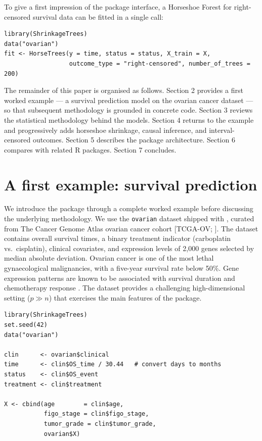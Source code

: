 To give a first impression of the package interface, a Horseshoe Forest for right-censored survival data can be fitted in a single call:

\begin{verbatim}
library(ShrinkageTrees)
data("ovarian")
fit <- HorseTrees(y = time, status = status, X_train = X,
                  outcome_type = "right-censored", number_of_trees = 200)
\end{verbatim}

The remainder of this paper is organised as follows. Section 2 provides a first worked example --- a survival prediction model on the ovarian cancer dataset --- so that subsequent methodology is grounded in concrete code. Section 3 reviews the statistical methodology behind the models. Section 4 returns to the example and progressively adds horseshoe shrinkage, causal inference, and interval-censored outcomes. Section 5 describes the package architecture. Section 6 compares  with related R packages. Section 7 concludes.

\section{A first example: survival prediction}\label{a-first-example-survival-prediction}

We introduce the package through a complete worked example before discussing the underlying methodology. We use the \texttt{ovarian} dataset shipped with , curated from The Cancer Genome Atlas ovarian cancer cohort {[}TCGA-OV; \citet{tcga2011ovarian}{]}. The dataset contains overall survival times, a binary treatment indicator (carboplatin vs.~cisplatin), clinical covariates, and expression levels of 2,000 genes selected by median absolute deviation. Ovarian cancer is one of the most lethal gynaecological malignancies, with a five-year survival rate below 50\%. Gene expression patterns are known to be associated with survival duration and chemotherapy response \citep{tcga2011ovarian}. The dataset provides a challenging high-dimensional setting (\(p \gg n\)) that exercises the main features of the package.

\begin{verbatim}
library(ShrinkageTrees)
set.seed(42)
data("ovarian")

clin      <- ovarian$clinical
time      <- clin$OS_time / 30.44   # convert days to months
status    <- clin$OS_event
treatment <- clin$treatment

X <- cbind(age        = clin$age,
           figo_stage = clin$figo_stage,
           tumor_grade = clin$tumor_grade,
           ovarian$X)
\end{verbatim}

